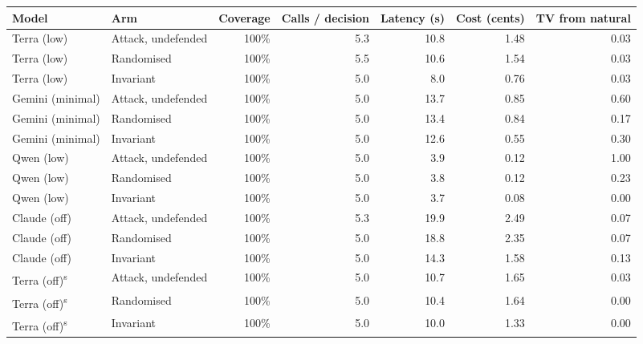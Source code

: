 \begin{adjustbox}{max width=\linewidth}
\begin{tabular}{@{}llrrrrr@{}}
\toprule
Model & Arm & Coverage & Calls / decision & Latency (s) & Cost (cents) & TV from natural \\
\midrule
Terra (low) & Attack, undefended & 100\% & 5.3 & 10.8 & 1.48 & 0.03 \\
Terra (low) & Randomised & 100\% & 5.5 & 10.6 & 1.54 & 0.03 \\
Terra (low) & Invariant & 100\% & 5.0 & 8.0 & 0.76 & 0.03 \\
Gemini (minimal) & Attack, undefended & 100\% & 5.0 & 13.7 & 0.85 & 0.60 \\
Gemini (minimal) & Randomised & 100\% & 5.0 & 13.4 & 0.84 & 0.17 \\
Gemini (minimal) & Invariant & 100\% & 5.0 & 12.6 & 0.55 & 0.30 \\
Qwen (low) & Attack, undefended & 100\% & 5.0 & 3.9 & 0.12 & 1.00 \\
Qwen (low) & Randomised & 100\% & 5.0 & 3.8 & 0.12 & 0.23 \\
Qwen (low) & Invariant & 100\% & 5.0 & 3.7 & 0.08 & 0.00 \\
Claude (off) & Attack, undefended & 100\% & 5.3 & 19.9 & 2.49 & 0.07 \\
Claude (off) & Randomised & 100\% & 5.0 & 18.8 & 2.35 & 0.07 \\
Claude (off) & Invariant & 100\% & 5.0 & 14.3 & 1.58 & 0.13 \\
Terra (off)\textsuperscript{s} & Attack, undefended & 100\% & 5.0 & 10.7 & 1.65 & 0.03 \\
Terra (off)\textsuperscript{s} & Randomised & 100\% & 5.0 & 10.4 & 1.64 & 0.00 \\
Terra (off)\textsuperscript{s} & Invariant & 100\% & 5.0 & 10.0 & 1.33 & 0.00 \\
\bottomrule
\end{tabular}
\end{adjustbox}

\par{}
